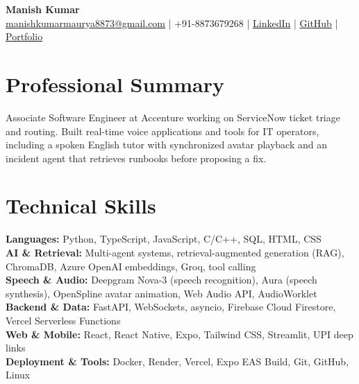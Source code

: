 \documentclass[a4paper,10pt]{article}
\begin{document}
\fontsize{10pt}{12pt}\selectfont


\begin{center}
    {\LARGE \textbf{Manish Kumar}}\\[2pt]
    \href{mailto:manishkumarmaurya8873@gmail.com}{manishkumarmaurya8873@gmail.com}
    \quad | \quad
    +91-8873679268
    \quad | \quad
    \href{https://www.linkedin.com/in/manish-kumar-22cs3037/}{LinkedIn}
    \quad | \quad
    \href{https://github.com/Mani1454}{GitHub}
    \quad | \quad 
    \href{https://mani1454.github.io/portfolio/}{Portfolio}
\end{center}

\vspace{-4pt}


\section*{Professional Summary}
Associate Software Engineer at Accenture working on ServiceNow ticket triage and routing. Built real-time voice applications and tools for IT operators, including a spoken English tutor with synchronized avatar playback and an incident agent that retrieves runbooks before proposing a fix.


\section*{Technical Skills}
\textbf{Languages:} Python, TypeScript, JavaScript, C/C++, SQL, HTML, CSS \\
\textbf{AI \& Retrieval:} Multi-agent systems, retrieval-augmented generation (RAG), ChromaDB, Azure OpenAI embeddings, Groq, tool calling \\
\textbf{Speech \& Audio:} Deepgram Nova-3 (speech recognition), Aura (speech synthesis), OpenSpline avatar animation, Web Audio API, AudioWorklet \\
\textbf{Backend \& Data:} FastAPI, WebSockets, asyncio, Firebase Cloud Firestore, Vercel Serverless Functions \\
\textbf{Web \& Mobile:} React, React Native, Expo, Tailwind CSS, Streamlit, UPI deep links \\
\textbf{Deployment \& Tools:} Docker, Render, Vercel, Expo EAS Build, Git, GitHub, Linux
\end{document}
